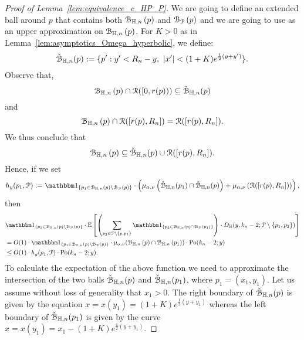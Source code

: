 \begin{proof}[Proof of Lemma~\ref{lem:equivalence_c_HP_P}]
We are going to define an extended ball around $p$ that contains both ${\mathcal B}_{\mathbb{H},n}\left(p\right)$ and ${\mathcal B}_{{\mathcal P}}\left(p\right)$ and we are going to use as an upper approximation on ${\mathcal B}_{\mathbb{H},n}\left(p\right)$.
For $K > 0$ as in Lemma~\ref{lem:asymptotics_Omega_hyperbolic}, we define:
\begin{equation}\label{eq:def_fatball_K}
	\check{{\mathcal B}}_{\mathbb{H},n}(p) : = \{ p^\prime : y^\prime < R_n - y, \ |x^\prime| < (1+K) e^{\frac{1}{2} (y + y^\prime)}  \}.
\end{equation}
Observe that,
\begin{equation*} %
\BallHyp{p} \cap \Rcal ([0,r(p))) \subseteq \FatBallHyp{p}
\end{equation*}
and 
\begin{equation*} %
\BallHyp{p} \cap \Rcal ([r(p),R_n]) = \Rcal ([r(p),R_n]).
\end{equation*}
We thus conclude that 
\begin{equation} \label{eq:ball_inclusions}
{\mathcal B}_{\mathbb{H},n}\left(p\right) \subseteq \check{{\mathcal B}}_{\mathbb{H},n}(p) \cup {\mathcal R}([r(p),R_n]).
\end{equation}
Hence, if we set 
\[
h_y(p_1, \Pcal) := \ind{p_1 \in \BallHyp{p}\setminus \BallPo{p}} \cdot    
\left( \mu_{\alpha,\nu} \left( \FatBallHyp{p_1} \cap \FatBallHyp{p} \right)
+ \mu_{\alpha,\nu} \left( \Rcal([r(p),R_n]) \right) \right),
\]
then 
\begin{equation*}
\begin{split}
&\ind{p_1\in \BallHyp{p}\setminus \BallPo{p}} \cdot \Exp{ \left(\sum_{p_2 \in \Pcal \setminus 
\{p,p_1\}} \ind{p_2 \in \BallHyp{p} \cap \BallPo{p_1}}\right) \cdot 
D_\H (y,k_n-2;\Pcal \setminus \{ p_1, p_2\})
} \\
&=O(1)\cdot
\ind{p_1\in \BallHyp{p}\setminus \BallPo{p}} \cdot \mu_{\alpha,\nu} (\BallHyp{p}\cap \BallHyp{p_1}) \cdot  \Pop{y}{k_n-2} \\
& \leq O(1) \cdot  h_y (p_1, \Pcal)\cdot  \Pop{y}{k_n-2}. 
\end{split}
\end{equation*}
To calculate the expectation of the above function we need to approximate the 
intersection of the two balls $\check{{\mathcal B}}_{\mathbb{H},n}(p)$ and $\check{{\mathcal B}}_{\mathbb{H},n}(p_1)$, 
where $p_1= (x_1,y_1)$. 
Let us assume without loss of generality that $x_1 > 0$. 
The right boundary of $\check{{\mathcal B}}_{\mathbb{H},n}(p)$ is given by the equation 
$x = x(y_1) = (1+K)e^{\frac{1}{2} (y + y_1)}$ whereas the left boundary of $\check{{\mathcal B}}_{\mathbb{H},n}(p_1)$ is given by the curve $x = x(y_1)= x_1 - (1+ K)e^{\frac{1}{2} (y + y_1)}.$ 


\end{proof}
